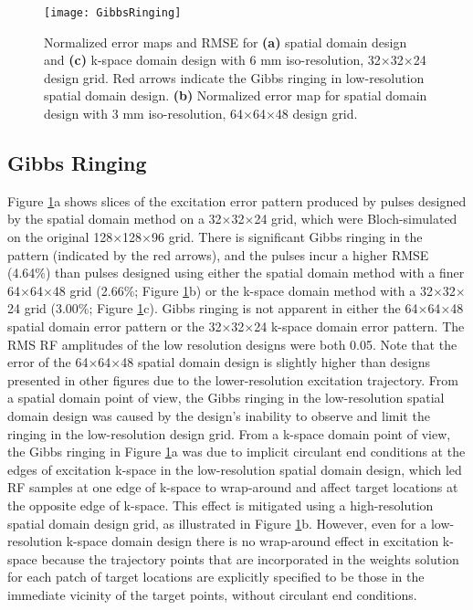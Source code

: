 \begin{figure}
	\centering
	\texttt{[image: GibbsRinging]}
	\caption{Normalized error maps and RMSE for \textbf{(a)} spatial domain design and \textbf{(c)} k-space domain design with 6 mm iso-resolution, 32$\times$32$\times$24 design grid. Red arrows indicate the Gibbs ringing in low-resolution spatial domain design. \textbf{(b)} Normalized error map for spatial domain design with 3 mm iso-resolution, 64$\times$64$\times$48 design grid.}
	\label{fig:GibbsRing}
\end{figure}

\subsection*{Gibbs Ringing}
Figure \ref{fig:GibbsRing}a shows slices of the excitation error pattern produced by pulses designed by the spatial domain method
on a 32$\times$32$\times$24 grid, which were Bloch-simulated on the original 128$\times$128$\times$96 grid. 
There is significant Gibbs ringing in the pattern (indicated by the red arrows),
and the pulses incur a higher RMSE (4.64\%) than pulses designed using either the spatial domain method with a finer 64$\times$64$\times$48 grid
(2.66\%; Figure \ref{fig:GibbsRing}b) or the k-space domain method with a 32$\times$32$\times$24 grid (3.00\%; Figure \ref{fig:GibbsRing}c). 
Gibbs ringing is not apparent in either the 64$\times$64$\times$48 spatial domain error pattern or the 32$\times$32$\times$24 k-space domain error pattern. 
The RMS RF amplitudes of the low resolution designs were both 0.05. 
Note that the error of the 64$\times$64$\times$48 spatial domain design is slightly higher than designs presented in other figures
due to the lower-resolution excitation trajectory. 
From a spatial domain point of view, 
the Gibbs ringing in the low-resolution spatial domain design was caused by the design's inability to observe and limit the ringing in the low-resolution design grid. 
From a k-space domain point of view, the Gibbs ringing in 
Figure \ref{fig:GibbsRing}a was due to implicit circulant end conditions at the edges of excitation k-space in the low-resolution
spatial domain design,
which led RF samples at one edge of k-space to wrap-around and affect target locations at the opposite edge of k-space. 
This effect is mitigated using a high-resolution spatial domain design grid, as illustrated in Figure \ref{fig:GibbsRing}b. 
However, even for a low-resolution k-space domain design there is no wrap-around effect in excitation k-space 
because the trajectory points that are incorporated in the weights solution for each patch of target locations are explicitly specified to be those in the immediate vicinity of 
the target points, without circulant end conditions. 

